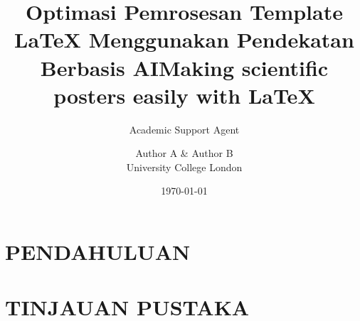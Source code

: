 \documentclass{a0poster}
\title{Optimasi Pemrosesan Template LaTeX Menggunakan Pendekatan Berbasis AI}
\author{Academic Support Agent}
\date{\today}
\begin{document}
\maketitle

\begin{abstract}

\end{abstract}

\chapter{PENDAHULUAN}


\chapter{TINJAUAN PUSTAKA}


\usepackage{multicol} 			%
\usepackage[left=2cm,right=2cm,bottom=0cm,top=0cm]{geometry}			%

\setlength{\columnsep}{2cm}				%
\setlength{\columnseprule}{1pt}			%

\makeatletter							%
\renewcommand\@maketitle{%
\null									%
{
\VERYHuge					%
\@title \par}%
\vskip 0.6em%
{
\large						%
\lineskip .5em%
\begin{tabular}[t]{l}%
\@author
\end{tabular}\par}%
\vskip 1cm
\par
}
\makeatother

\title{Making scientific posters easily with \LaTeX}

\author{Author A \& Author B\\
University College London}
\end{document}

